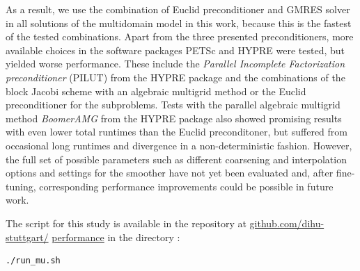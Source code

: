 As a result, we use the combination of Euclid preconditioner and GMRES solver in all solutions of the multidomain model in this work, because this is the fastest of the tested combinations. Apart from the three presented preconditioners, more available choices in the software packages PETSc and HYPRE were tested, but yielded worse performance. These include the \emph{Parallel Incomplete Factorization preconditioner} (PILUT) from the HYPRE package and the combinations of the block Jacobi scheme with an algebraic multigrid method or the Euclid preconditioner for the subproblems. Tests with the parallel algebraic multigrid method \emph{BoomerAMG} from the HYPRE package also showed promising results with even lower total runtimes than the Euclid preconditoner, but suffered from occasional long runtimes and divergence in a non-deterministic fashion. However, the full set of possible parameters such as different coarsening and interpolation options and settings for the smoother have not yet been evaluated and, after fine-tuning, corresponding performance improvements could be possible in future work.

\begin{reproduce_no_break}
  The script for this study is available in the repository at \href{https://github.com/dihu-stuttgart/performance}{github.com/dihu-stuttgart/} \href{https://github.com/dihu-stuttgart/performance}{performance} in the directory :
  \begin{lstlisting}[columns=fullflexible,breaklines=true,postbreak=\mbox{\textcolor{gray}{$\hookrightarrow$}\space}]
    ./run_mu.sh
  \end{lstlisting}
\end{reproduce_no_break}

